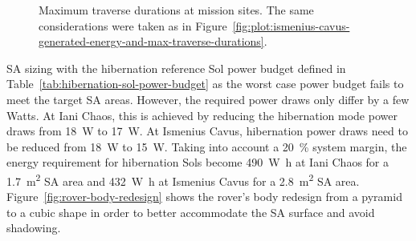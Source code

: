 \documentclass[twocolumn,letterpaper]{IEEEAerospaceCLS}  %
\newcommand{\refFig}[1]{{Figure}~\ref{#1}} %
\newcommand{\refTab}[1]{{Table}~\ref{#1}}  %
\newlength{\subfigureWidth}
\begin{document}
\begin{figure}[h]
\begin{subfigure}[t]{\subfigureWidth}
    \label{fig:plot:sub:final-maximum-traverse-durations-ismenius-cavus}
  \end{subfigure}
  \caption{Maximum traverse durations at mission sites. The same considerations were taken as in \refFig{fig:plot:ismenius-cavus-generated-energy-and-max-traverse-durations}.}
  \label{fig:plot:final-maximum-traverse-durations-at-missions-sites}
\end{figure}

\ac{SA} sizing with the hibernation reference Sol power budget defined in \refTab{tab:hibernation-sol-power-budget} as the worst case power budget fails to meet the target \ac{SA} areas. However, the required power draws only differ by a few Watts. At Iani Chaos, this is achieved by reducing the hibernation mode power draws from \SI{18}{\watt} to \SI{17}{\watt}. At Ismenius Cavus, hibernation power draws need to be reduced from \SI{18}{\watt} to \SI{15}{\watt}. Taking into account a \SI{20}{\percent} system margin, the energy requirement for hibernation Sols become \SI{490}{\watt\hour} at Iani Chaos for a \SI{1.7}{m^{2}} \ac{SA} area and \SI{432}{\watt\hour} at Ismenius Cavus for a \SI{2.8}{m^{2}} \ac{SA} area. \refFig{fig:rover-body-redesign} shows the rover's body redesign from a pyramid to a cubic shape in order to better accommodate the \ac{SA} surface and avoid shadowing.
\end{document}
